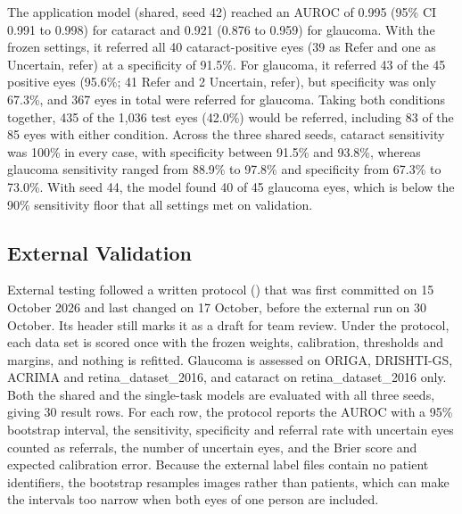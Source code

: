 \documentclass[conference,a4paper]{IEEEtran}
\begin{document}
The application model (shared, seed 42) reached an AUROC of 0.995 (95\% CI 0.991 to 0.998) for
cataract and 0.921 (0.876 to 0.959) for glaucoma. With the frozen settings, it referred all 40
cataract-positive eyes (39 as Refer and one as Uncertain, refer) at a specificity of 91.5\%. For
glaucoma, it referred 43 of the 45 positive eyes (95.6\%; 41 Refer and 2 Uncertain, refer), but
specificity was only 67.3\%, and 367 eyes in total were referred for glaucoma. Taking both
conditions together, 435 of the 1,036 test eyes (42.0\%) would be referred, including 83 of the 85
eyes with either condition. Across the three shared seeds, cataract sensitivity was 100\% in every
case, with specificity between 91.5\% and 93.8\%, whereas glaucoma sensitivity ranged from 88.9\% to
97.8\% and specificity from 67.3\% to 73.0\%. With seed 44, the model found 40 of 45 glaucoma eyes,
which is below the 90\% sensitivity floor that all settings met on validation.

\subsection{External Validation}

External testing followed a written protocol
() that was first committed on 15 October
2026 and last changed on 17 October, before the external run on 30 October. Its header still marks
it as a draft for team review. Under the protocol, each data set is scored once with the frozen
weights, calibration, thresholds and margins, and nothing is refitted. Glaucoma is assessed on
ORIGA, DRISHTI-GS, ACRIMA and retina\_dataset\_2016, and cataract on retina\_dataset\_2016 only.
Both the shared and the single-task models are evaluated with all three seeds, giving 30 result
rows. For each row, the protocol reports the AUROC with a 95\% bootstrap interval, the sensitivity,
specificity and referral rate with uncertain eyes counted as referrals, the number of uncertain
eyes, and the Brier score and expected calibration error. Because the external label files contain
no patient identifiers, the bootstrap resamples images rather than patients, which can make the
intervals too narrow when both eyes of one person are included.
\end{document}
